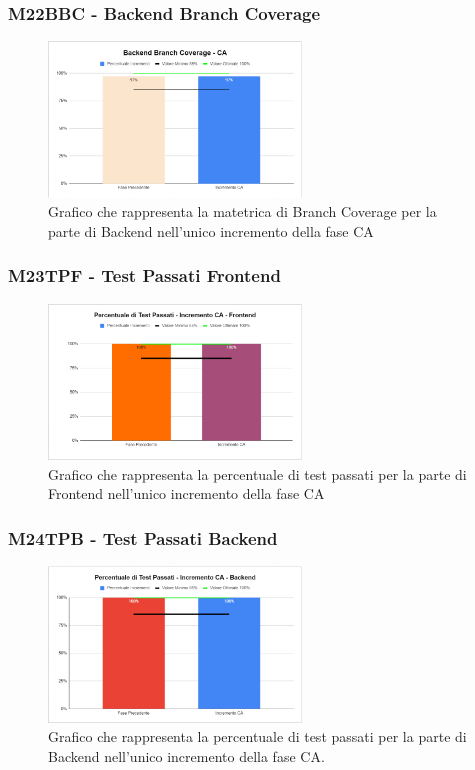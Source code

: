 \subsubsection{M22BBC - Backend Branch Coverage}
\begin{figure}[H]
  \centering\includegraphics[width=0.6\textwidth, height=0.6\textheight,keepaspectratio]{images/CA-Backend-Branch.png}
  \caption{Grafico che rappresenta la matetrica di Branch Coverage per la parte di Backend nell'unico incremento della fase CA}
\end{figure}    

\subsubsection{M23TPF - Test Passati Frontend}  
\begin{figure}[H]
  \centering\includegraphics[width=0.6\textwidth, height=0.6\textheight,keepaspectratio]{images/CA-Test-Passati-Frontend.png}
  \caption{Grafico che rappresenta la percentuale di test passati per la parte di Frontend nell'unico incremento della fase CA}
\end{figure}    

\subsubsection{M24TPB - Test Passati Backend}
\begin{figure}[H]
  \centering\includegraphics[width=0.6\textwidth, height=0.6\textheight,keepaspectratio]{images/CA-Test-Passati-Backend.png}
  \caption{Grafico che rappresenta la percentuale di test passati per la parte di Backend nell'unico incremento della fase CA.}
\end{figure}    